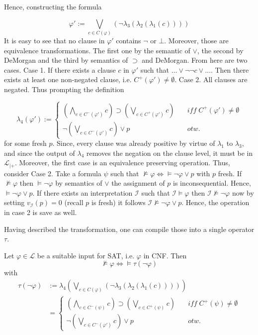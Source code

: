 \documentclass[11pt,a4paper]{article}
\begin{document}
Hence, constructing the formula  

\begin{equation*}
\varphi' := \bigvee_{c \in C(\varphi)}   (\neg \lambda_3(\lambda_2(\lambda_1(c))) )
\end{equation*}
It is easy to see that no clause in $\varphi'$ contains $\neg$ or $\bot$. Moreover, those are equivalence transformations. The first one by the semantic of $\lor$, the second by DeMorgan and the third by semantics of $\supset$ and DeMorgan. From here are two cases. Case 1. If there exists a clause $c$ in $\varphi'$ such that $\dots \lor \neg \neg c \lor \dots$. Then there exists at least one non-negated clause, i.e. $C^+(\varphi')\neq \emptyset$. Case 2. All clauses are negated. Thus prompting the definition

\begin{equation*}
\lambda_4(\varphi'):=
\begin{cases}
(\bigwedge_{c \in C^-(\varphi')}  c) \supset (\bigvee_{c \in C^+(\varphi')} c) &\quad \mathit{iff}\; C^+(\varphi')\neq \emptyset \\
\neg (\bigvee_{c \in C^-(\varphi')} c) \lor p  &\quad otw.
\end{cases}
\end{equation*}
for some fresh $p$.
Since, every clause was already positive by virtue of $\lambda_1$ to $\lambda_3$, and since the output of $\lambda_4$ removes the negation on the clause level, it must be in $\mathcal{L}_{|+}$. Moreover, the first case is an equivalence preserving operation. Thus, consider Case 2. Take a formula $\psi$ such that 
$\nvDash \varphi \iff \models \neg \varphi \lor p$ with $p$ fresh. If $\nvDash \varphi$ then $\models \neg \varphi$ by semantics of $\lor$ the assignment of $p$ is inconsequential. Hence, $\models \neg \varphi \lor p$. If there exists an interpretation $\mathcal{I}$ such that $\mathcal{I}\models \varphi$ then $\mathcal{I} \nvDash \neg \varphi$ now by setting $v_{\mathcal{I}}(p)=0$ (recall $p$ is fresh) it follows $\mathcal{I} \nvDash \neg \varphi \lor p$. Hence, the operation in case 2 is save as well.

Having described the transformation, one can compile those into a single operator $\tau$.



Let $\varphi \in \mathcal{L}$ be a suitable input for SAT, i.e. $\varphi$ in CNF.
Then 
\begin{equation*}
\nvDash \varphi \iff \models \tau(\neg \varphi)
\end{equation*}
with 
\begin{equation*}
\begin{split}
\tau(\neg \varphi)&:= \lambda_4(\bigvee_{c \in C(\varphi)}  (\neg \lambda_3(\lambda_2(\lambda_1(c))) ))
\\
&=
\begin{cases}
(\bigwedge_{c \in C^-(\psi)}  c) \supset (\bigvee_{c \in C^+(\psi)} c) &\quad \mathit{iff}\; C^+(\psi)\neq \emptyset \\
\neg (\bigvee_{c \in C^-(\varphi')} c) \lor p  &\quad otw.
\end{cases}
\end{split}
\end{equation*}
\end{document}
